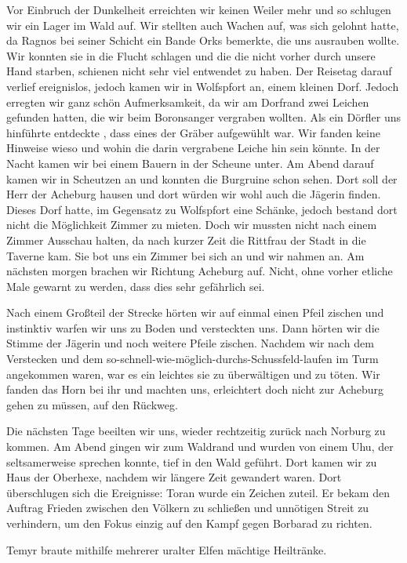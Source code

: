 \documentclass[11pt]{scrreprt}
\begin{document}
Vor Einbruch der Dunkelheit erreichten wir keinen Weiler mehr und so schlugen wir ein Lager im Wald auf. Wir stellten auch Wachen auf, was sich gelohnt hatte, da Ragnos bei seiner Schicht ein Bande Orks bemerkte, die uns ausrauben wollte. Wir konnten sie in die Flucht schlagen und die die nicht vorher durch unsere Hand starben, schienen nicht sehr viel entwendet zu haben. Der Reisetag darauf verlief ereignislos, jedoch kamen wir in Wolfspfort an, einem kleinen Dorf. Jedoch erregten wir ganz schön Aufmerksamkeit, da wir am Dorfrand zwei Leichen gefunden hatten, die wir beim Boronsanger vergraben wollten. Als ein Dörfler uns hinführte entdeckte , dass eines der Gräber aufgewühlt war. Wir fanden keine Hinweise wieso und wohin die darin vergrabene Leiche hin sein könnte. In der Nacht kamen wir bei einem Bauern in der Scheune unter. Am Abend darauf kamen wir in Scheutzen an und konnten die Burgruine schon sehen. Dort soll der Herr der Acheburg hausen und dort würden wir wohl auch die Jägerin finden. Dieses Dorf hatte, im Gegensatz zu Wolfspfort eine Schänke, jedoch bestand dort nicht die Möglichkeit Zimmer zu mieten. Doch wir mussten nicht nach einem Zimmer Ausschau halten, da nach kurzer Zeit die Rittfrau der Stadt in die Taverne kam. Sie bot uns ein Zimmer bei sich an und wir nahmen an.
Am nächsten morgen brachen wir Richtung Acheburg auf. Nicht, ohne vorher etliche Male gewarnt zu werden, dass dies sehr gefährlich sei.\par
Nach einem Großteil der Strecke hörten wir auf einmal einen Pfeil zischen und instinktiv warfen wir uns zu Boden und versteckten uns. Dann hörten wir die Stimme der Jägerin und noch weitere Pfeile zischen.
Nachdem wir nach dem Verstecken und dem so-schnell-wie-möglich-durchs-Schussfeld-laufen im Turm angekommen waren, war es ein leichtes sie zu überwältigen und zu töten. Wir fanden das Horn bei ihr und machten uns, erleichtert doch nicht zur Acheburg gehen zu müssen, auf den Rückweg.\par
Die nächsten Tage beeilten wir uns, wieder rechtzeitig zurück nach Norburg zu kommen. Am Abend gingen wir zum Waldrand und wurden von einem Uhu, der seltsamerweise sprechen konnte, tief in den Wald geführt. Dort kamen wir zu Haus der Oberhexe, nachdem wir längere Zeit gewandert waren. Dort überschlugen sich die Ereignisse:
Toran wurde ein Zeichen zuteil. Er bekam den Auftrag Frieden zwischen den Völkern zu schließen und unnötigen Streit zu verhindern, um den Fokus einzig auf den Kampf gegen Borbarad zu richten.\par
Temyr braute mithilfe mehrerer uralter Elfen mächtige Heiltränke.\par
\end{document}
